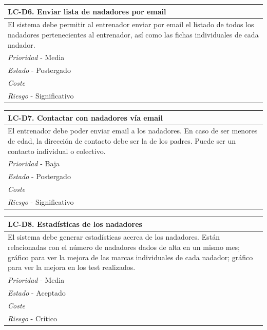 	\begin{center}
		\begin{tabularx}{15cm}{|X|}
			\hline 
				\bf{LC-D6. Enviar lista de nadadores por email}\\
			\hline
				El sistema debe permitir al entrenador enviar por email el listado de todos los nadadores pertenecientes al entrenador, así como las fichas individuales de cada nadador.\\
			\hline
				{\it Prioridad} - Media\\
			\hline
				{\it Estado} - Postergado\\
			\hline
				{\it Coste}\\
			\hline
				{\it Riesgo} - Significativo\\
			\hline
		\end{tabularx}
	\end{center}
	
	\begin{center}
		\begin{tabularx}{15cm}{|X|}
			\hline 
				\bf{LC-D7. Contactar con nadadores vía email}\\
			\hline
				El entrenador debe poder enviar email a los nadadores. En caso de ser menores de edad, la dirección de contacto debe ser la de los padres. Puede ser un contacto individual o colectivo.\\
			\hline
				{\it Prioridad} - Baja\\
			\hline
				{\it Estado} - Postergado\\
			\hline
				{\it Coste}\\
			\hline
				{\it Riesgo} - Significativo\\
			\hline
		\end{tabularx}
	\end{center}
	
	\begin{center}
		\begin{tabularx}{15cm}{|X|}
			\hline 
				\bf{LC-D8. Estadísticas de los nadadores}\\
			\hline
				El sistema debe generar estadísticas acerca de los nadadores. Están relacionadas con el número de nadadores dados de alta en un mismo mes; gráfico para ver la mejora de las marcas individuales de cada nadador; gráfico para ver la mejora en los test realizados.\\
			\hline
				{\it Prioridad} - Media\\
			\hline
				{\it Estado} - Aceptado\\
			\hline
				{\it Coste}\\
			\hline
				{\it Riesgo} - Crítico\\
			\hline
		\end{tabularx}
	\end{center}
	
